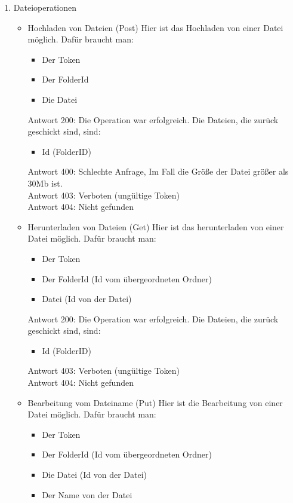 \begin{enumerate}
\item Dateioperationen
\begin{itemize}
\item Hochladen von Dateien (Post)
Hier ist das Hochladen von einer Datei m\"oglich. Daf\"ur braucht man: 
\begin{itemize}
\item Der Token
\item Der FolderId 
\item Die Datei
\end{itemize}
Antwort 200: Die Operation war erfolgreich. Die Dateien, die zur\"uck geschickt sind, sind:
\begin{itemize}
\item Id (FolderID)
\end{itemize}
Antwort 400: Schlechte Anfrage, Im Fall die Gr\"o{\ss}e der Datei gr\"o{\ss}er als 30Mb ist. \\
Antwort 403: Verboten (ung\"ultige Token) \\
Antwort 404: Nicht gefunden
\item Herunterladen von Dateien (Get)
Hier ist das herunterladen von einer Datei m\"oglich. Daf\"ur braucht man:
\begin{itemize}
\item Der Token
\item Der FolderId (Id vom \"ubergeordneten Ordner)
\item Datei (Id von der Datei)
\end{itemize}
Antwort 200: Die Operation war erfolgreich. Die Dateien, die zur\"uck geschickt sind, sind:
\begin{itemize}
\item Id (FolderID)
\end{itemize}
Antwort 403: Verboten (ung\"ultige Token) \\
Antwort 404: Nicht gefunden
\item Bearbeitung vom Dateiname (Put)
Hier ist die Bearbeitung von einer Datei m\"oglich. Daf\"ur braucht man:
\begin{itemize}
\item Der Token
\item Der FolderId (Id vom \"ubergeordneten Ordner)
\item Die Datei (Id von der Datei)
\item Der Name von der Datei 
\end{itemize}


\end{itemize}
\end{enumerate}
